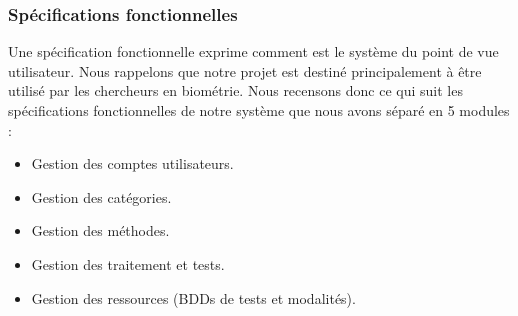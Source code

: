 \subsubsection{Spécifications fonctionnelles}
Une spécification fonctionnelle exprime comment est le
système du point de vue utilisateur. Nous rappelons que notre projet est destiné principalement à être utilisé par les chercheurs en biométrie. Nous recensons donc ce qui suit les spécifications fonctionnelles de notre système que nous avons séparé en 5 modules :
\begin{itemize}
	\item Gestion des comptes utilisateurs.
	\item Gestion des catégories. 
	\item Gestion des méthodes. 
	\item Gestion des traitement et tests. 
	\item Gestion des ressources (BDDs de tests et modalités). 
\end{itemize}
